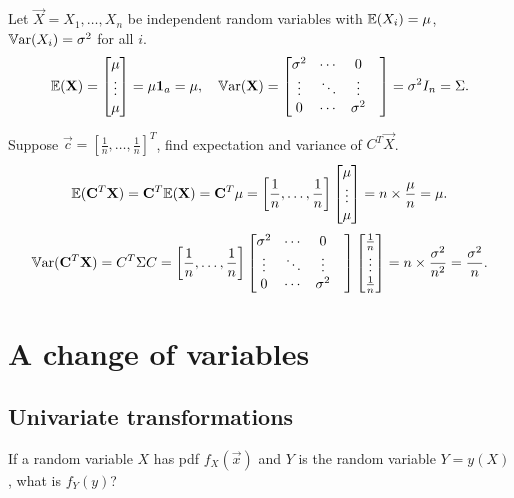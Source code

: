 \documentclass[10pt, a4paper]{article}
\begin{document}
\begin{example}
    Let $\vec{X} = X_1, \dotsc, X_n$ be independent random variables with $\mathbb{E}(X_i) = \mu$,
    $\mathbb{V}\mathrm{ar}(X_i) = \sigma ^ 2$ for all $i$.
    \[
    \mathbb{E}(\mathbf{X}) = \begin{bmatrix}
        \mu \\ \vdots \\ \mu
    \end{bmatrix} = \mu\mathbf{1}_a = \mathbf{\mu},\quad \mathbb{V}\mathrm{ar}(\mathbf{X}) = \begin{bmatrix}
        \sigma ^ 2 & \dotsi & 0 \\
        \vdots & \ddots & \vdots & \\
        0 & \dotsi & \sigma ^ 2
    \end{bmatrix} = \sigma ^ 2I_n = \Sigma.
    \]

    Suppose $\vec{c} = \left[\frac{1}{n}, \dotsc, \frac{1}{n}\right] ^ T$,
    find expectation and variance of $C ^ T\vec{X}$.
    \[
        \mathbb{E}(\mathbf{C} ^ T\mathbf{X}) = \mathbf{C} ^ T\mathbb{E}(\mathbf{X}) = \mathbf{C} ^ T\mathbf{\mu} = \left[\frac{1}{n}, \dotsc, \frac{1}{n}\right]\begin{bmatrix}
        \mu \\ \vdots \\ \mu
    \end{bmatrix} = n \times \frac{\mu}{n} = \mu.
    \]
    \[
    \mathbb{V}\mathrm{ar}(\mathbf{C} ^ T\mathbf{X}) = C ^ T\Sigma C = \left[\frac{1}{n}, \dotsc, \frac{1}{n}\right] \begin{bmatrix}
        \sigma ^ 2 & \dotsi & 0 \\
        \vdots & \ddots & \vdots & \\
        0 & \dotsi & \sigma ^ 2
    \end{bmatrix}\begin{bmatrix}
        \frac{1}{n} \\ \vdots \\ \frac{1}{n}
    \end{bmatrix} = n \times \frac{\sigma ^ 2}{n ^ 2} = \frac{\sigma ^ 2}{n}.
    \]
\end{example}

\newpage

\section{A change of variables}

\subsection{Univariate transformations}
If a random variable $X$ has pdf $f_{X}(\vec{x})$ and $Y$ is the random variable $Y = y(X)$,
what is $f_Y(y)$?
\end{document}
